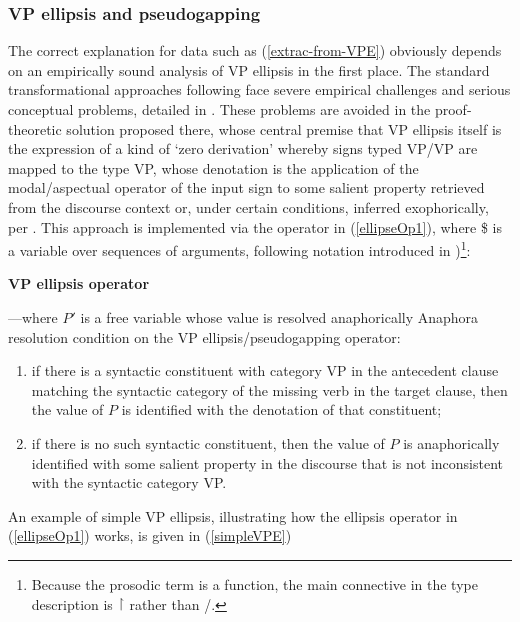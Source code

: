 \documentclass[output=paper,colorlinks,citecolor=brown]{langscibook}
\begin{document}
\subsubsection{VP ellipsis and pseudogapping}\label{subsubsec:VPE}

The correct explanation for data such as (\ref{extrac-from-VPE}) obviously
depends on an empirically sound analysis of VP ellipsis in the first
place. The standard transformational approaches following \citet{kuno1981}
face severe empirical challenges and serious conceptual problems,
detailed in \citet{kubota-levine-pseudo}. These problems are avoided in the
proof-theoretic solution proposed there, whose central premise that VP
ellipsis itself is the expression of a kind of `zero derivation'
whereby signs typed VP/VP are mapped to the type VP, whose denotation
is the application of the modal/aspectual operator of the input sign
to some salient property retrieved from the discourse context or,
under certain conditions, inferred exophorically, per
\citet{MillerPullum13}. This approach is implemented via the operator in
(\ref{ellipseOp1}), where \$ is a variable over sequences of arguments,
following notation introduced in \citet{steedman2000a})\footnote{Because the
prosodic term is a function, the main connective in the type
description is \ensuremath{\vs} rather than /.}:

\begin{exe}
 \ex\label{ellipseOp1}
  \textbf{VP ellipsis operator} \\

  ---where $P'$ is a free variable whose value is
  resolved anaphorically
 \ex\label{Acondition}
  Anaphora resolution condition on the VP ellipsis/pseudogapping
  operator:
  \begin{enumerate}
   \item
    if there is a syntactic  constituent
    with category VP in the antecedent clause matching the
    syntactic  category of the missing verb in the target clause,
    then the value of $P$ is identified with the denotation of that constituent;
   \item
    if there is no such syntactic  constituent, then the value of $P$  is anaphorically
    identified with some salient property in the discourse that is not
    inconsistent with the syntactic  category VP.
  \end{enumerate}
\end{exe}
An example of simple VP ellipsis, illustrating how the ellipsis operator
in (\ref{ellipseOp1}) works, is given in (\ref{simpleVPE})
\end{document}
